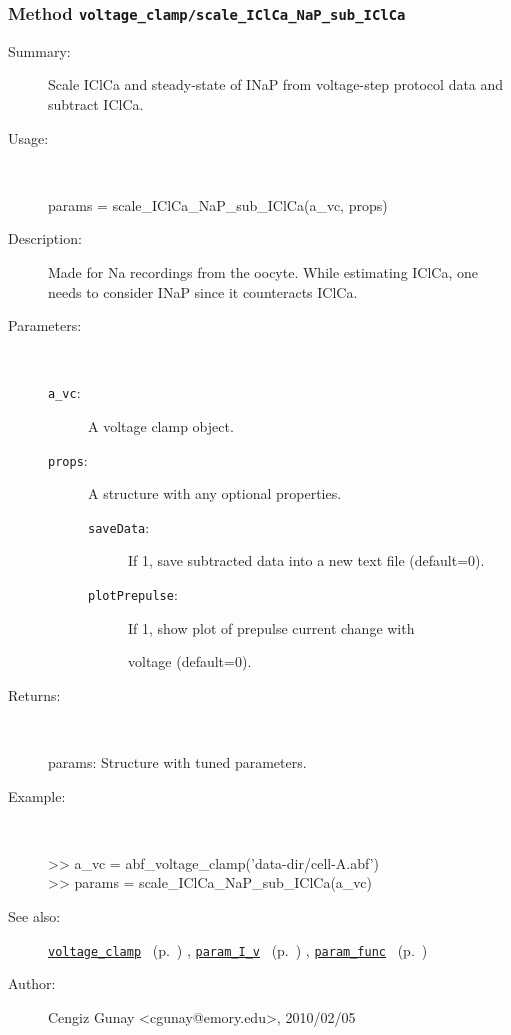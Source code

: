\subsubsection[Method \texttt{scale\_IClCa\_NaP\_sub\_IClCa}]{Method \texttt{voltage\_clamp/scale\_IClCa\_NaP\_sub\_IClCa}}%
%
\label{ref_voltage_clamp__scale_IClCa_NaP_sub_IClCa}%
\hypertarget{ref_voltage_clamp__scale_IClCa_NaP_sub_IClCa}{}%
\begin{description}
\item[Summary:]Scale IClCa and steady-state of INaP from voltage-step protocol data and subtract IClCa.
%
\item[Usage:]~%
\begin{lyxcode}%
params = scale\_IClCa\_NaP\_sub\_IClCa(a\_vc, props)
%
\end{lyxcode}%
%
\item[Description:]%
Made for Na recordings from the oocyte. While estimating IClCa, one
 needs to consider INaP since it counteracts IClCa.
\item[Parameters:]~
\begin{description}%
\item[\texttt{a\_vc}:]
 A voltage clamp object.
\item[\texttt{props}:]
 A structure with any optional properties.
\begin{description}%
\item[\texttt{saveData}:]
 If 1, save subtracted data into a new text file (default=0).
\item[\texttt{plotPrepulse}:]
 If 1, show plot of prepulse current change with

voltage (default=0).
\end{description}%
\end{description}%
%
\item[Returns:
]~

   params: Structure with tuned parameters.
%
\item[Example:]~
\begin{lyxcode} >> a\_vc = abf\_voltage\_clamp('data-dir/cell-A.abf')
\\%
 >> params = scale\_IClCa\_NaP\_sub\_IClCa(a\_vc)
\\%
\end{lyxcode}
%
\item[See also:]%
\hyperlink{ref_voltage_clamp}{\texttt{voltage\_clamp}}%
\ (p.~\pageref{ref_voltage_clamp})%
%
, \hyperlink{ref_param_I_v}{\texttt{param\_I\_v}}%
\ (p.~\pageref{ref_param_I_v})%
%
, \hyperlink{ref_param_func}{\texttt{param\_func}}%
\ (p.~\pageref{ref_param_func})%
%
%
\item[Author:]%
Cengiz Gunay <cgunay@emory.edu>, 2010/02/05
%
\end{description}
\methodline%
